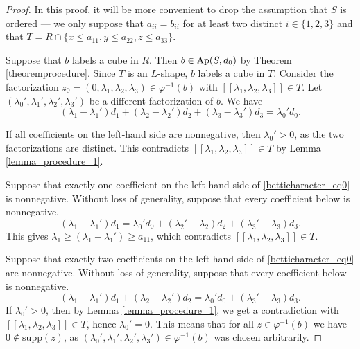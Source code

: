 \documentclass[12pt]{article}
\theoremstyle{remark}
\begin{document}
\begin{proof}
    In this proof, it will be more convenient to drop the assumption that $S$ is ordered --- we only suppose that $a_{ii}=b_{ii}$ for at least two distinct $i \in \{1,2,3\}$ and that  $T = R \cap \{x \leq a_{11},y\leq a_{22}, z \leq a_{33}\}$.
    
    Suppose that $b$ labels a cube in $R$. Then $b \in \textup{Ap}(S,d_0)$ by Theorem \ref{theoremprocedure}. Since $T$ is an $L$-shape, $b$ labels a cube in $T$.   Consider the factorization $z_0 =(0,\lambda_1,\lambda_2, \lambda_3) \in \varphi^{-1}(b)$ with $[[\lambda_1,\lambda_2,\lambda_3]] \in T$. Let $(\lambda_0',\lambda_1',\lambda_2', \lambda_3')$ be a different factorization of $b$. We have
    \begin{equation}\label{betticharacter_eq0}
        (\lambda_1-\lambda_1')d_1 +  (\lambda_2-\lambda_2')d_2 +  (\lambda_3-\lambda_3')d_3 = \lambda_0'd_0.
    \end{equation}

    If all coefficients on the left-hand side are nonnegative, then $\lambda_0'>0$, as the two factorizations are distinct. This contradicts $[[\lambda_1,\lambda_2,\lambda_3]] \in T$ by Lemma \ref{lemma_procedure_1}. 


    Suppose that exactly one coefficient on the left-hand side of \eqref{betticharacter_eq0} is nonnegative. Without loss of generality, suppose that every coefficient below is nonnegative.
    \begin{equation}\label{betticharacter_eq00}
        (\lambda_1-\lambda_1')d_1   = \lambda_0'd_0 + (\lambda_2'-\lambda_2)d_2 +  (\lambda_3'-\lambda_3)d_3.
    \end{equation}
    This gives $\lambda_1 \geq (\lambda_1-\lambda_1') \geq a_{11}$, which contradicts $[[\lambda_1,\lambda_2,\lambda_3]] \in T$.
    

    Suppose that exactly two coefficients on the left-hand side of \eqref{betticharacter_eq0} are nonnegative. Without loss of generality, suppose that every coefficient below is nonnegative.
     \begin{equation}\label{betticharacter_eq01}
        (\lambda_1-\lambda_1')d_1 +  (\lambda_2-\lambda_2')d_2  = \lambda_0'd_0 +  (\lambda_3'-\lambda_3)d_3.
    \end{equation}
    If $\lambda_0'>0$, then by Lemma \ref{lemma_procedure_1}, we get a contradiction with $[[\lambda_1,\lambda_2,\lambda_3]] \in T$, hence $\lambda_0'=0$. This means that for all $z \in \varphi^{-1}(b)$ we have $0 \notin \text{supp}(z)$, as $(\lambda_0',\lambda_1',\lambda_2', \lambda_3') \in \varphi^{-1}(b)$ was chosen arbitrarily. 


\end{proof}
\end{document}
